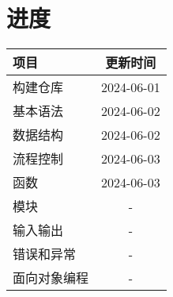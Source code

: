 \documentclass[a4paper,12pt]{article}
\begin{document}
    \section{进度}
        \begin{table}
        \centering
            \begin{tabular}{lc}
                项目                    &   更新时间 \\
                \hline
                构建仓库                &   2024-06-01 \\
                基本语法                &   2024-06-02 \\
                数据结构                &   2024-06-02 \\
                流程控制                &   2024-06-03 \\
                函数                    &   2024-06-03 \\
                模块                    &   - \\
                输入输出                &   - \\
                错误和异常                &   - \\
                面向对象编程            &   - \\
            \end{tabular}
        \end{table}
\end{document}
